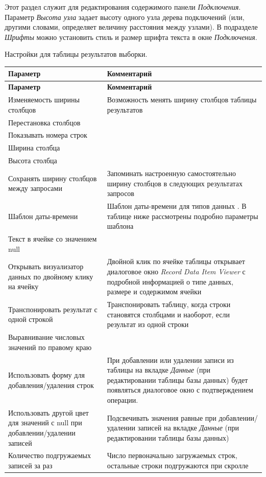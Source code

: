 
Этот раздел служит для редактирования содержимого панели \textit{Подключения}.
Параметр \textit{Высота узла} задает высоту одного узла дерева подключений (или, другими словами, определяет величину расстояния между узлами). В подразделе \textit{Шрифты} можно установить стиль и размер шрифта текста в окне \textit{Подключения}.


Настройки для таблицы результатов выборки.

\begin{longtable}[r]{|>{\ttfamily}m{5cm}|m{10.5cm}|}
	\hline
	\centering\normalfont\bfseries Параметр &
	\centering\arraybslash\bfseries Комментарий\\\hline
	\endfirsthead
	\hline
	\centering\normalfont\bfseries Параметр &
	\centering\arraybslash\bfseries Комментарий\\\hline
	\endhead
	\hline
	Изменяемость ширины столбцов &  Возможность менять ширину столбцов таблицы результатов \\\hline
	Перестановка столбцов & \\\hline
	Показывать номера строк & \\\hline
	Ширина столбца & \\\hline
	Высота столбца &  \\\hline
	Сохранять ширину столбцов между запросами & Запоминать настроенную самостоятельно ширину столбцов в следующих результатах запросов \\\hline
	Шаблон даты-времени & Шаблон даты-времени для типов данных \ttt{DATE,TIME,TIMESTAMP}. В таблице ниже рассмотрены подробно параметры шаблона\\\hline
	Текст в ячейке со значением null &  \\\hline
	Открывать визуализатор данных по двойному клику на ячейку & Двойной клик по ячейке таблицы открывает диалоговое окно \textit{Record Data Item Viewer} с подробной информацией о типе данных, размере и содержимом ячейки \\\hline
	Транспонировать результат с одной строкой & Транспонировать таблицу, когда строки становятся столбцами и наоборот, если результат из одной строки \\\hline
	Выравнивание числовых значений по правому краю &  \\\hline
	Использовать форму для добавления/удаления строк & При добавлении или удалении записи из таблицы на вкладке \textit{Данные} (при редактировании таблицы базы данных) будет появляться диалоговое окно с подтверждением операции. \\\hline
	Использовать другой цвет для значений с null при добавлении/удалении записей & Подсвечивать значения равные \ttt{NULL} при добавлении/удалении записей на вкладке \textit{Данные} (при редактировании таблицы базы данных) \\\hline
	Количество подгружаемых записей за раз & Число первоначально загружаемых строк, остальные строки подгружаются при скролле \\\hline
\end{longtable}

